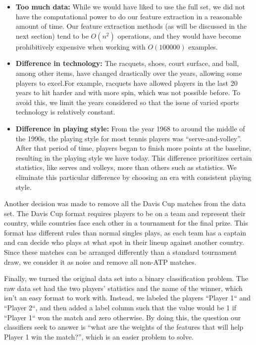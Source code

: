 \documentclass[conference]{IEEEtran}
\begin{document}
\begin{itemize}
	\item \textbf{Too much data:} While we would have liked to use the full set, we did not have the computational power to do our feature extraction in a reasonable amount of time. Our feature extraction methods (as will be discussed in the next section) tend to be $O(n^2)$ operations, and they would have become prohibitively expensive when working with $O(100000)$ examples.
	\item \textbf{Difference in technology:} The racquets, shoes, court surface, and ball, among other items, have changed drastically over the years, allowing some players to excel.For example, racquets have allowed players in the last 20 years to hit harder and with more spin, which was not possible before. To avoid this, we limit the years considered so that the issue of varied sports technology is relatively constant.
	\item \textbf{Difference in playing style:} From the year 1968 to around the middle of the 1990s, the playing style for most tennis players was ``serve-and-volley''. After that period of time, players began to finish more points at the baseline, resulting in the playing style we have today. This difference prioritizes certain statistics, like serves and volleys, more than others such as statistics. We eliminate this particular difference by choosing an era with consistent playing style.
\end{itemize}

Another decision was made to remove all the Davis Cup matches from the data set. The Davis Cup format requires players to be on a team and represent their country, while countries face each other in a tournament for the final prize. This format has different rules than normal singles plays, as each team has a captain and can decide who plays at what spot in their lineup against another country. Since these matches can be arranged differently than a standard tournament draw, we consider it as noise and remove all non-ATP matches.

Finally, we turned the original data set into a binary classification problem. The raw data set had the two players' statistics and the name of the winner, which isn't an easy format to work with. Instead, we labeled the players ``Player 1`` and ``Player 2``, and then added a label column such that the value would be 1 if ``Player 1`` won the match and zero otherwise. By doing this, the question our classifiers seek to answer is ``what are the weights of the features that will help Player 1 win the match?'', which is an easier problem to solve.
\end{document}
